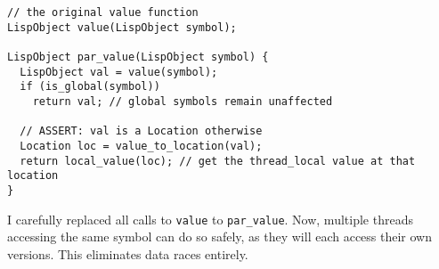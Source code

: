 \begin{verbatim}
// the original value function
LispObject value(LispObject symbol);

LispObject par_value(LispObject symbol) {
  LispObject val = value(symbol);
  if (is_global(symbol))
    return val; // global symbols remain unaffected

  // ASSERT: val is a Location otherwise
  Location loc = value_to_location(val);
  return local_value(loc); // get the thread_local value at that location
}
\end{verbatim}

I carefully replaced all calls to \texttt{value} to \texttt{par\_value}. Now, multiple threads accessing the same symbol
can do so safely, as they will each access their own versions. This eliminates data races entirely.





